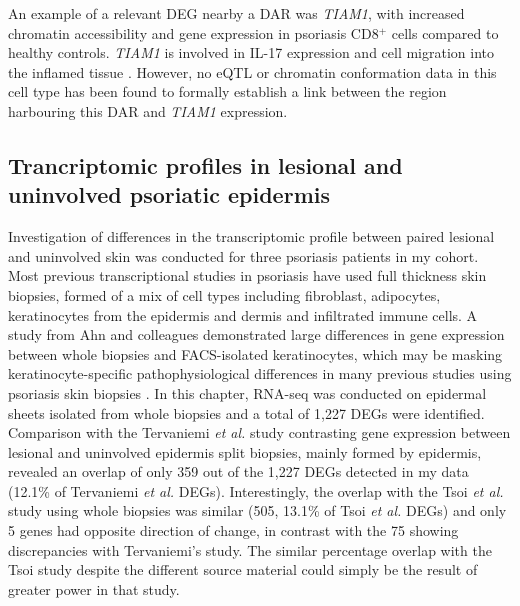 An example of a relevant DEG nearby a DAR was \textit{TIAM1}, with increased chromatin accessibility and gene expression in psoriasis CD8$^+$ cells compared to healthy controls. \textit{TIAM1} is involved in IL-17 expression and cell migration into the inflamed tissue \parencite{Kurdi2016, Gerard2009}.  However, no eQTL or chromatin conformation data in this cell type has been found to formally establish a link between the region harbouring this DAR and \textit{TIAM1} expression.


\subsection{Trancriptomic profiles in lesional and uninvolved psoriatic epidermis}
Investigation of differences in the transcriptomic profile between paired lesional and uninvolved skin was conducted for three psoriasis patients in my cohort. Most previous transcriptional studies in psoriasis have used full thickness skin biopsies, formed of a mix of cell types including fibroblast, adipocytes, keratinocytes from the epidermis and dermis and infiltrated immune cells. A study from Ahn and colleagues demonstrated large differences in gene expression between whole biopsies and FACS-isolated keratinocytes, which may be masking keratinocyte-specific pathophysiological differences in many previous studies using psoriasis skin biopsies \parencite{Ahn2016}. In this chapter, RNA-seq was conducted on epidermal sheets isolated from whole biopsies and a total of 1,227 DEGs were identified. 
Comparison with the Tervaniemi \textit{et al.} study contrasting gene expression between lesional and uninvolved epidermis split biopsies, mainly formed by epidermis, revealed an overlap of only 359 out of the 1,227 DEGs detected in my data (12.1\% of Tervaniemi \textit{et al.} DEGs). Interestingly, the overlap with the Tsoi \textit{et al.} study using whole biopsies was similar (505, 13.1\% of Tsoi \textit{et al.} DEGs) and only 5 genes had opposite direction of change, in contrast with the 75 showing discrepancies with Tervaniemi’s study.  The similar percentage overlap with the Tsoi study despite the different source material could simply be the result of greater power in that study. 



